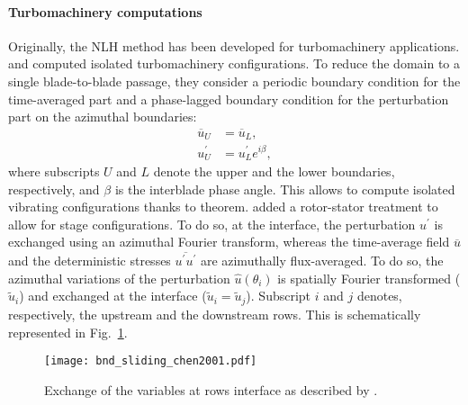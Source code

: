 \paragraph{Turbomachinery computations}
Originally, the NLH method has been developed for 
turbomachinery applications. \citet{He1998} and
\citet{Ning1998} computed isolated turbomachinery
configurations. To reduce the domain to a single 
blade-to-blade passage, they consider a periodic
boundary condition for the time-averaged part and a
phase-lagged boundary condition for the perturbation part on the
azimuthal boundaries:
\begin{equation}
    \begin{split}
    	\overline{u}_U &= \overline{u}_L, \\
    	u^\prime_U &= u^\prime_L e^{i \beta},
    \end{split}
\end{equation}
where subscripts $U$ and $L$ denote 
the upper and the lower boundaries, respectively, and $\beta$ is the
interblade phase angle. This allows to compute
isolated vibrating configurations thanks to 
\citet{Lane1956} theorem.
\citet{Chen2001} added a rotor-stator treatment
to allow for stage configurations. 
To do so, at the interface, the perturbation 
$u^\prime$ is exchanged using
an azimuthal Fourier transform, whereas
the time-average field $\overline{u}$ 
and the deterministic stresses 
$\overline{u^\prime u^\prime}$
are azimuthally flux-averaged.
To do so, the azimuthal variations of 
the perturbation $\widehat{u} (\theta_i)$
is spatially Fourier transformed ($\widetilde{u}_i$)
and exchanged at the interface 
($\widetilde{u}_i = \widetilde{u}_j$). Subscript $i$ and $j$ denotes,
respectively, the upstream and the downstream rows.
This is schematically represented in 
Fig.~\ref{fig:bnd_sliding_chen2001}.
\begin{figure}
  \centering
  \texttt{[image: bnd\_sliding\_chen2001.pdf]}
  \caption{Exchange of the variables at rows interface as described by \citet{Chen2001}.}
  \label{fig:bnd_sliding_chen2001}
\end{figure}

